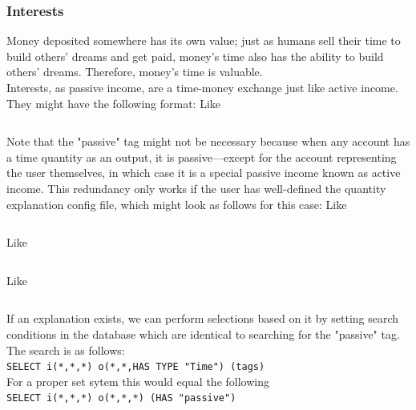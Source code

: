 \subsubsection{Interests}
Money deposited somewhere has its own value;
just as humans sell their time to build others'
dreams and get paid, money's time also has the ability to
build others' dreams. Therefore, money's time is valuable.\\
Interests, as passive income,
are a time-money exchange just like active income.
They might have the following format:
Like \inputminted{json}{jsonobs/interests-1.json}
Note that the "passive" tag might not be necessary because
when any account has a time quantity as an output, it is passive—except
for the account representing the user themselves, in which case it is
a special passive income known as active income. This
redundancy only works if the user has well-defined the quantity explanation
config file, which might look as follows for this case:
Like \inputminted{json}{jsonobs/interests-units.json}
Like \inputminted{json}{jsonobs/interests-P.json}
Like \inputminted{json}{jsonobs/interests-dP.json}
If an explanation exists, we can perform selections based on it
by setting search conditions in the database
which are identical to searching for the "passive" tag.
The search is as follows:\\
\texttt{SELECT i(*,*,*) o(*,*,HAS TYPE "Time") (tags)}\\
For a proper set sytem this would equal the following\\
\texttt{SELECT i(*,*,*) o(*,*,*) (HAS "passive")}




